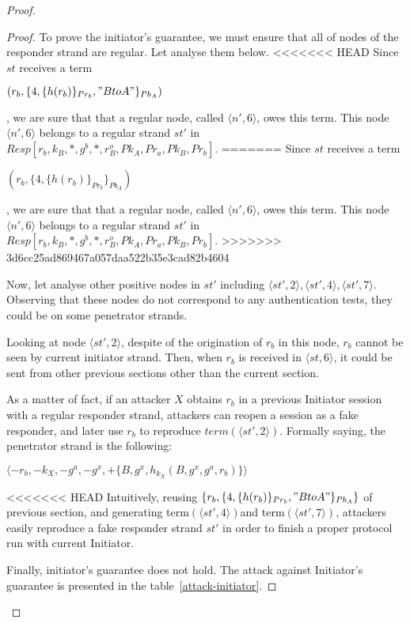\begin{Definition}
\begin{table}[b]
\begin{proof}
\begin{proof}
To prove the initiator's guarantee, we must ensure that all of nodes of the responder strand are regular. Let analyse them below.
<<<<<<< HEAD
Since $st$ receives a term \begin{center}$(r_b, \{4,\{h(r_b)\}_{Pr_b},"BtoA"\}_{Pb_A})$\end{center}, we are sure that that a regular node, called $\langle n',6\rangle $, owes this term. This node $\langle n',6\rangle $ belongs to a regular strand $st'$ in $Resp[r_b,k_B,*,g^b,*,r^o_B,Pk_A,Pr_a,Pk_B,Pr_b]$.
=======
Since $st$ receives a term \begin{center}$(r_b, \{4,\{h(r_b)\}_{Pr_b}\}_{Pb_A})$\end{center}, we are sure that that a regular node, called $\langle n',6\rangle $, owes this term. This node $\langle n',6\rangle $ belongs to a regular strand $st'$ in $Resp[r_b,k_B,*,g^b,*,r^o_B,Pk_A,Pr_a,Pk_B,Pr_b]$.
>>>>>>> 3d6cc25ad869467a057daa522b35e3cad82b4604

Now, let analyse other positive nodes in $st'$ including $\langle st',2\rangle ,\langle st',4\rangle ,\langle st',7\rangle $. Observing that these nodes do not correspond to any authentication tests, they could be on some penetrator strands. 

Looking at node $\langle st',2\rangle $, despite of the origination of $r_b$ in this node, $r_b$ cannot be seen by current initiator strand. Then, when $r_b$ is received in $\langle st,6\rangle$, it could be sent from other previous sections other than the current section. 

As a matter of fact, if an attacker $X$ obtains $r_b$ in a previous Initiator session with a regular responder strand, attackers can reopen a session as a fake responder, and later use $r_b$ to reproduce $term(\langle st',2\rangle )$. Formally saying, the penetrator strand is the following:\begin{center} $\langle-r_b,-k_X,-g^a,-g^{x}, +\{B, g^{x}, h_{k_X}(B,g^{x},g^a,r_b)\}\rangle$\end{center} 
<<<<<<< HEAD
Intuitively, reusing $\{r_b, \{4,\{h(r_b)\}_{Pr_b},"BtoA"\}_{Pb_A}\}$ of previous section, and generating term$(\langle st',4 \rangle)$and term$(\langle st',7 \rangle)$, attackers easily reproduce a fake responder strand $st'$ in order to finish a proper protocol run with current Initiator. 

Finally, initiator's guarantee does not hold. The attack against Initiator's guarantee is presented in the table~\ref{attack-initiator}. 


\end{proof}
\end{proof}
\end{table}
\end{Definition}
